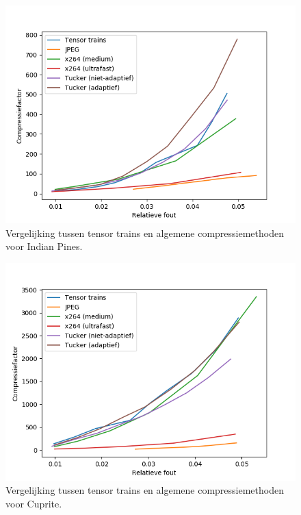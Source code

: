 \newpage
\begin{figure}[H]
  \centering
  \includegraphics[scale=0.7]{images/general_comparison_new_Indian_Pines.png}
  \caption{Vergelijking tussen tensor trains en algemene compressiemethoden voor Indian Pines.}
\label{fig:general-comparison-indian-pines}
\end{figure}

\begin{figure}[H]
  \centering
  \includegraphics[scale=0.7]{images/general_comparison_new_Cuprite.png}
  \caption{Vergelijking tussen tensor trains en algemene compressiemethoden voor Cuprite.}
\label{fig:general-comparison-cuprite}
\end{figure}


